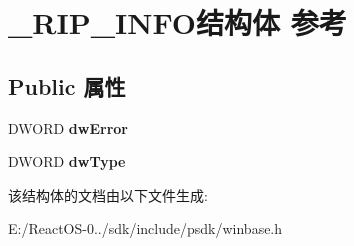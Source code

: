 \hypertarget{struct___r_i_p___i_n_f_o}{}\section{\+\_\+\+R\+I\+P\+\_\+\+I\+N\+F\+O结构体 参考}
\label{struct___r_i_p___i_n_f_o}
\subsection*{Public 属性}
\begin{DoxyCompactItemize}
\item 
\mbox{\label{struct___r_i_p___i_n_f_o_ade7d93becbab675b9f16edbabf005fee}} 
D\+W\+O\+RD {\bfseries dw\+Error}
\item 
\mbox{\label{struct___r_i_p___i_n_f_o_a005d0eb08ff4b0a34c638a2cb59e8e59}} 
D\+W\+O\+RD {\bfseries dw\+Type}
\end{DoxyCompactItemize}


该结构体的文档由以下文件生成\+:\begin{DoxyCompactItemize}
\item 
E\+:/\+React\+O\+S-\/0../sdk/include/psdk/winbase.\+h\end{DoxyCompactItemize}
